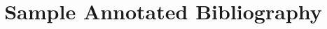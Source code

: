 \documentclass[11pt]{article}
\begin{document}
\title{Sample Annotated Bibliography}\nocite{*} %

\maketitle


 
\end{document}
